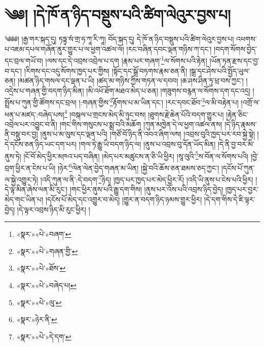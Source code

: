 \chapter{༄༅། །དེ་ཁོ་ན་ཉིད་བསྡུས་པའི་ཚིག་ལེའུར་བྱས་པ།}༄༅༅། །རྒྱ་གར་སྐད་དུ། ཏཏྟྭ་སཾ་གྲ་ཧ་ཀཱ་རི་ཀཱ། བོད་སྐད་དུ། དེ་ཁོ་ན་ཉིད་བསྡུས་པའི་ཚིག་ལེའུར་བྱས་པ། འཕགས་པ་འཇམ་དཔལ་གཞོན་ནུར་གྱུར་པ་ལ་ཕྱག་འཚལ་ལོ། །རང་བཞིན་དབང་ལྡན་གཉིས་ཀ་དང་། །བདག་སོགས་བྱེད་དང་བྲལ་གཡོ་བ། །ལས་དང་དེ་འབྲས་འབྲེལ་པ་དག །རྣམ་པར་གཞག་\footnote{«སྣར་»«པེ་»བཞག་}ལ་སོགས་པའི་རྟེན། །ཡོན་ཏན་རྫས་དང་བྱ་བ་དང་། །རིགས་དང་འདུ་སོགས་ཁྱད་པར་གྱིས། །སྟོང་དང་སྒྲོ་བཏགས་རྣམ་ཅན་ནི། །སྒྲ་དང་ཤེས་པའི་སྤྱོད་ཡུལ་ཅན། །མཚན་ཉིད་གསལ་དང་ལྡན་པ་ཡི། །ཚད་མ་གཉིས་ཀྱིས་གཏན་ལ་དབབ། །ཆ་ཤས་ཤིན་ཏུ་ཕྲ་བས་ཀྱང་། །འདྲེས་པ་གཞན་གྱི་བདག་ཉིད་མིན། །མི་འཕོ་ཐོག་མཐའ་མེད་པ་ཅན། །གཟུགས་བརྙན་ལ་སོགས་དག་དང་འདྲ། །སྤྲོས་པ་ཀུན་གྱི་ཚོགས་དང་བྲལ། །:གཞན་གྱིས་\footnote{«སྣར་»«པེ་»གཞན་གྱི་}རྟོགས་པ་མ་ཡིན་དང་། །རང་དབང་ཐོབ་\footnote{«སྣར་»«པེ་»ཐོས་}ལ་མི་བརྟེན་པ། །འགྲོ་ལ་ཕན་པ་མཛད་:བཞེད་པས།\footnote{«སྣར་»«པེ་»བཞེད་པ།} །བསྐལ་པ་གྲངས་མེད་མི་ཉུང་བས། །ཐུགས་རྗེ་ཆེན་པོའི་བདག་གྱུར་པ། །རྟེན་ཅིང་འབྲེལ་པར་འབྱུང་བ་ནི། །གང་གིས་གསུངས་པ་སྨྲ་བའི་མཆོག །ཀུན་མཁྱེན་དེ་ལ་ཕྱག་འཚལ་ནས། །དེ་ཉིད་རྣམས་ནི་བསྡུ་བར་བྱ། །ནུས་པ་མ་ལུས་དང་ལྡན་པའི། །གཙོ་བོ་ཉིད་ནི་འབའ་ཞིག་ལས། །འབྲས་བུའི་ཁྱད་པར་རབ་སྐྱེ་སྟེ། །དེ་དངོས་ཅན་ཉིད་ཡང་དག་པར། །གལ་ཏེ་རྒྱུ་ཡི་བདག་ཉིད་ལ། །ནུས་པ་འབྲས་བུ་དོན་ཡོད་མིན། །དེ་ནི་བྱ་བར་མི་ནུས་ཏེ། །ངོ་བོ་མེད་ཕྱིར་མཁའ་པད་བཞིན། །མེད་པར་མཚུངས་ན་ཅི་ཡི་ཕྱིར། །སཱ་ལུའི་\footnote{«སྣར་»«པེ་»ལུ་}ས་བོན་ལ་སོགས་པའི། །བྱེ་བྲག་ཕྱིར་ན་ངེས་པ་ཡི། །ཉེར་\footnote{«སྣར་»ཉེར་ནི་}ལེན་ལེན་བྱེད་གཞན་མ་ཡིན། །སྐྱེ་བའི་ཆོས་ཅན་ཐམས་ཅད་ཀྱང་། །དངོས་པོ་ཀུན་ལ་སྐྱེ་འགྱུར་ཏེ། །འདི་ཀུན་ལ་ནི་:དེ་བདག་\footnote{«སྣར་»«པེ་»དེ་དག་}ཉིད། །ཁྱད་པར་ཁྱད་པར་མེད་ཕྱིར་རོ། །འདི་ཡི་ནུས་པ་ངེས་པའི་ཕྱིར། །དེ་ལྟ་མིན་ཞེས་ལན་མི་རུང་། །གང་ཕྱིར་ནུས་པའི་རྒྱུ་དག་གིས། །ནུས་པར་འོས་པའི་འབྲས་ཉིད་བྱེད། །ཁྱད་པར་བྱར་མེད་གང་ཡིན་པ། །དངོས་པོ་མེད་དང་འགྱུར་བ་མེད། །གྱུར་ན་བདག་ཉིད་ཉམས་གྱུར་ཕྱིར། །དེ་དག་གིས་དེ་ཇི་ལྟར་བྱེད། །དེ་ལྟར་འབྲས་ཉིད་མི་རུང་ཕྱིར། །
